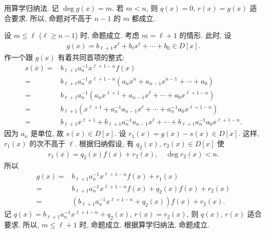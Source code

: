\begin{pf}
    用算学归纳法. 记 $\deg g(x) = m$. 若 $m<n$, 则 $q(x) = 0$, $r(x) = g(x)$ 适合要求. 所以, 命题对不高于 $n-1$ 的 $m$ 都成立.

    设 $m \leq \ell$ ($\ell \geq n-1$) 时, 命题成立. 考虑 $m=\ell+1$ 的情形. 此时, 设
    \begin{align*}
        g(x) = b_{\ell + 1} x^{\ell} + b_{\ell} x^{\ell} + \cdots + b_0 \in D[x].
    \end{align*}
    作一个跟 $g(x)$ 有着共同首项的整式:
    \begin{align*}
        s(x) = {} & b_{\ell + 1} a_n^{-1} x^{\ell + 1 - n} f(x)                                                                               \\
        = {}      & b_{\ell + 1} a_n^{-1} x^{\ell + 1 - n} (a_n x^n + a_{n-1} x^{n-1} + \cdots + a_0)                                         \\
        = {}      & b_{\ell + 1} a_n^{-1} (a_n x^{\ell + 1} + a_{n-1} x^{\ell} + \cdots + a_0 x^{\ell + 1 - n})                               \\
        = {}      & b_{\ell + 1} (x^{\ell + 1} + a_n^{-1} a_{n-1} x^{\ell} + \cdots + a_n^{-1} a_0 x^{\ell + 1 - n})                          \\
        = {}      & b_{\ell + 1} x^{\ell + 1} + b_{\ell + 1} a_n^{-1} a_{n-1} x^{\ell} + \cdots + b_{\ell + 1} a_n^{-1} a_0 x^{\ell + 1 - n}.
    \end{align*}
    因为 $a_n$ 是单位, 故 $s(x) \in D[x]$. 设 $r_1 (x) = g(x) - s(x) \in D[x]$. 这样, $r_1 (x)$ 的次不高于 $\ell$. 根据归纳假设, 有 $q_2 (x)$, $r_2(x) \in D[x]$ 使
    \begin{align*}
        r_1 (x) = q_2 (x) f(x) + r_2 (x), \quad \deg r_2 (x) < n.
    \end{align*}
    所以
    \begin{align*}
        g(x)
        = {} & b_{\ell+1} a_n^{-1} x^{\ell+1-n} f(x) + r_1 (x)                \\
        = {} & b_{\ell+1} a_n^{-1} x^{\ell+1-n} f(x) + q_2 (x) f(x) + r_2 (x) \\
        = {} & (b_{\ell+1} a_n^{-1} x^{\ell+1-n} + q_2 (x)) f(x) + r_2 (x).
    \end{align*}
    记 $q(x) = b_{\ell+1} a_n^{-1} x^{\ell+1-n} + q_2 (x)$, $r(x) = r_2 (x)$, 则 $q(x)$, $r(x)$ 适合要求. 所以, $m \leq \ell + 1$ 时, 命题成立. 根据算学归纳法, 命题成立.
\end{pf}

